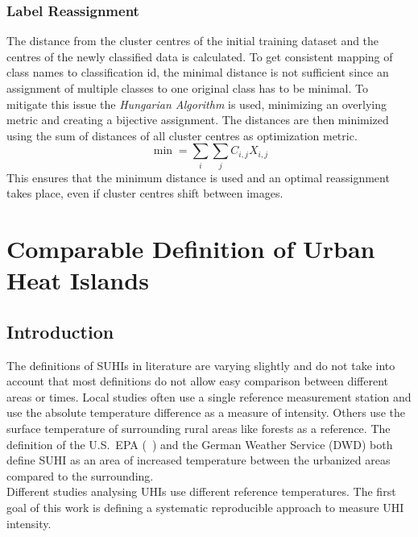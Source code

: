 \documentclass[12pt,a4paper, english,twoside]{scrartcl}
\begin{document}
    \subsubsection{Label Reassignment}\label{sec:labelassignment}
    The distance from the cluster centres of the initial training dataset and the centres of the newly classified data is calculated. 
    To get consistent mapping of class names to classification id, the minimal distance is not sufficient since an assignment of multiple classes to one original class has to be minimal. 
    To mitigate this issue the \textit{Hungarian Algorithm} is used, minimizing an overlying metric and creating a bijective assignment. 
    The distances are then minimized using the sum of distances of all cluster centres as optimization metric.
      \begin{equation}
        \min = \sum_{i}\sum_{j} C_{i,j}X_{i,j}
      \end{equation}
    This ensures that the minimum distance is used and an optimal reassignment takes place, even if cluster centres shift between images.
\newpage
\section{Comparable Definition of Urban Heat Islands}\label{sec:definition}
    \subsection{Introduction}
      The definitions of \glspl{SUHI} in literature are varying slightly and do not take into account that most definitions do not allow easy comparison between different areas or times.
      Local studies often use a single reference measurement station and use the absolute temperature difference as a measure of intensity.
      Others use the surface temperature of surrounding rural areas like forests as a reference.
      The definition of the U.S.~EPA (~\cite{EPA2008}) and the German Weather Service (\gls{DWD}) both define \gls{SUHI} as an area of increased temperature between the urbanized areas compared to the surrounding.\\ 
      Different studies analysing \glspl{UHI} use different reference temperatures.
      The first goal of this work is defining a systematic reproducible approach to measure \gls{UHI} intensity.
\end{document}
